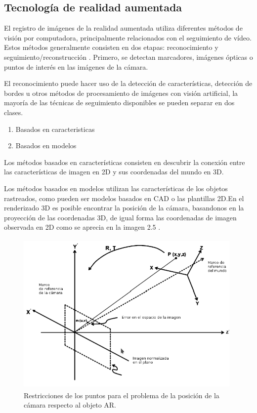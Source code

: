 \subsection{Tecnología de realidad aumentada}
El registro de imágenes de la realidad aumentada utiliza diferentes métodos de visión por computadora, principalmente relacionados con el seguimiento de vídeo. Estos métodos generalmente consisten en dos etapas: reconocimiento y seguimiento/reconstrucción . Primero, se detectan marcadores, imágenes ópticas o puntos de interés en las imágenes de la cámara.\cite{B27} \par
\vspace{5mm}
El reconocimiento puede hacer uso de la detección de características, detección de bordes u otros métodos de procesamiento de imágenes con visión artificial, la mayoría de las técnicas de seguimiento disponibles se pueden separar en dos clases\cite{B27}. \par
\begin{enumerate}[1.]
	\item Basados en caracteristicas
	\item Basados en modelos
\end{enumerate}

\vspace{5mm}
Los métodos basados en características consisten en descubrir la conexión entre las características de imagen en 2D y sus coordenadas del mundo en 3D. \cite{B27} \par
\vspace{5mm}
Los métodos basados en modelos utilizan las características de los objetos rastreados, como pueden ser modelos basados en CAD o las plantillas 2D.En el renderizado 3D es posible encontrar la posición de la cámara, basandonos en la proyección de las coordenadas 3D, de igual forma las coordenadas de imagen observada en 2D  como se aprecia en la imagen 2.5 \cite{B27}.\par
\begin{figure}[h!]
	\centering
	\includegraphics[width=11cm,height=8cm]{imagenes/marcoteorico/ar/tecnologyAR.png}
	\caption{Restricciones de los puntos para el problema de la posición de la cámara respecto al objeto AR.\cite{B27}}
	\label{fig:analogo}
\end{figure}
